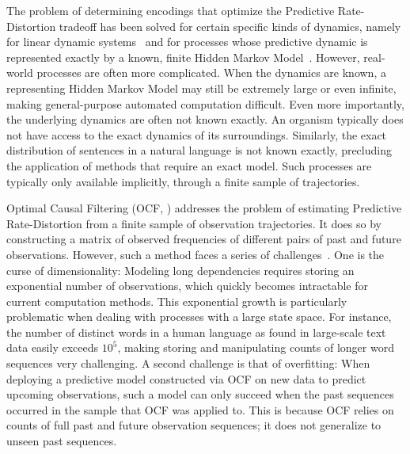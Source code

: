 \documentclass[entropy,article,submit,moreauthors,pdftex,10pt,a4paper]{Definitions/mdpi}
\begin{document}
The problem of determining encodings that optimize the Predictive Rate-Distortion tradeoff has been solved for certain specific kinds of dynamics, namely for linear dynamic systems~\citep{creutzig-past-future-2009} and for processes whose predictive dynamic is represented exactly by a known, finite Hidden Markov Model~\citep{marzen-predictive-2016}.
However, real-world processes are often more complicated.
When the dynamics are known, a representing Hidden Markov Model may still be extremely large or even infinite, making general-purpose automated computation difficult.
Even more importantly, the underlying dynamics are often not known exactly.
An organism typically does not have access to the exact dynamics of its surroundings.
Similarly, the exact distribution of sentences in a natural language is not known exactly, precluding the application of methods that require an exact model.
Such processes are typically only available implicitly, through a finite sample of trajectories.



Optimal Causal Filtering (OCF, \citet{still-optimal-2010}) addresses the problem of estimating Predictive Rate-Distortion from a finite sample of observation trajectories.
It does so by constructing a matrix of observed frequencies of different pairs of past and future observations.
However, such a method faces a series of challenges~\citep{marzen-predictive-2016}.
One is the curse of dimensionality:
Modeling long dependencies requires storing an exponential number of observations, which quickly becomes intractable for current computation methods.
This exponential growth is particularly problematic when dealing with processes with a large state space.
For instance, the number of distinct words in a human language as found in large-scale text data easily exceeds $10^5$, making storing and manipulating counts of longer word sequences very challenging.
A second challenge is that of overfitting:
When deploying a predictive model constructed via OCF on new data to predict upcoming observations, such a model can only succeed when the past sequences occurred in the sample that OCF was applied to.
This is because OCF relies on counts of full past and future observation sequences; it does not generalize to unseen past sequences.
\end{document}

